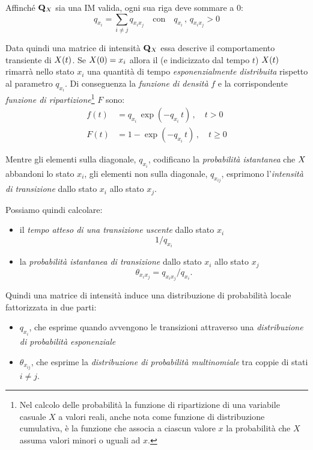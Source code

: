 Affinché $\mathbf{Q}_{\mathnormal{X}}$ sia una \acl{IM} valida, ogni sua riga deve sommare a $0$:
\[
q_{x_i}=\sum_{i \neq j}q_{x_ix_j}\quad\text{con}\quad q_{x_i}\,,\,q_{x_ix_j}>0
\]

Data quindi una matrice di intensità $\mathbf{Q}_{\mathnormal{X}}$ essa descrive il comportamento transiente di $\mathnormal{X}(t)$. Se $\mathnormal{X}(0)=x_i$ allora il \mprocess*{} \omog*{} (e indicizzato dal tempo $t$) $\mathnormal{X}(t)$ rimarrà nello stato $x_i$ una quantità di tempo \emph{esponenzialmente distribuita} rispetto al parametro $q_{x_i}$. Di conseguenza la \emph{funzione di densità} $f$ e la corrispondente \emph{funzione di ripartizione}\footnote{Nel calcolo delle probabilità la funzione di ripartizione di una variabile casuale $X$ a valori reali, anche nota come funzione di distribuzione cumulativa, è la funzione che associa a ciascun valore $x$ la probabilità che $X$ assuma valori minori o uguali ad $x$.} $F$ sono:
\begin{equation}
\label{eq:im-distrib}
\begin{split}
f(t) &= q_{x_i}\,\exp(-q_{x_i}\,t)\,,\quad t>0 \\
F(t) &= 1-\exp(-q_{x_i}\,t)\,,\quad t\geq0
\end{split} 
\end{equation}

Mentre gli elementi sulla diagonale, $q_{x_i}$, codificano la \emph{probabilità istantanea} che $\mathnormal{X}$ abbandoni lo stato $x_i$, gli elementi non sulla diagonale, $q_{x_{ij}}$, esprimono l'\emph{intensità di transizione} dallo stato $x_i$ allo stato $x_j$. 

Possiamo quindi calcolare:
\begin{itemize}
    \item il \emph{tempo atteso di una transizione uscente} dallo stato $x_i$ \[1/q_{x_i}\]
    \item la \emph{probabilità istantanea di transizione} dallo stato $x_i$ allo stato $x_j$ \[\theta_{x_ix_j}=q_{x_ix_j}/q_{x_i}\text{.}\]
\end{itemize}

Quindi una matrice di intensità induce una distribuzione di probabilità locale fattorizzata in due parti:
\begin{itemize}
    \item $q_{x_i}$, che esprime quando avvengono le transizioni attraverso una \emph{distribuzione di probabilità esponenziale}
    \item $\theta_{x_{ij}}$, che esprime la \emph{distribuzione di probabilità multinomiale} tra coppie di stati $i \neq j$.
\end{itemize}

